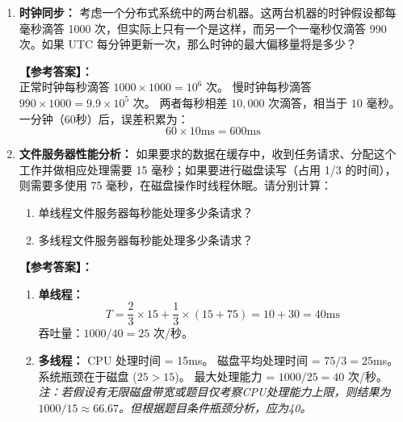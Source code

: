 \documentclass[a4paper,12pt]{article}
\newcommand{\answer}[1]{\par\vspace{0.5em}\hspace{2em}\textbf{【参考答案】：}\\{\color{blue}#1}\par\vspace{1em}}
\begin{document}
\begin{enumerate}[label=\arabic*.]
    \answer{
    \begin{enumerate}[label=(\arabic*)]
        \item 一次读取 32k 数据的 RPC 所需时间：
        \[ T = 1.0 + 32 \times 1.5 = 1.0 + 48 = 49 \text{ms} \]
        \item 32 次读取 1k 数据所需时间：
        每次调用时间 = $1.0 + 1 \times 1.5 = 2.5 \text{ms}$。
        总时间 $T_1 = 32 \times 2.5 = 80 \text{ms}$。
    \end{enumerate}
    }

    \item \textbf{时钟同步：}
    考虑一个分布式系统中的两台机器。这两台机器的时钟假设都每毫秒滴答 1000 次，但实际上只有一个是这样，而另一个一毫秒仅滴答 990 次。如果 UTC 每分钟更新一次，那么时钟的最大偏移量将是多少？
    
    \answer{
    正常时钟每秒滴答 $1000 \times 1000 = 10^6$ 次。
    慢时钟每秒滴答 $990 \times 1000 = 9.9 \times 10^5$ 次。
    两者每秒相差 $10,000$ 次滴答，相当于 $10$ 毫秒。
    一分钟（60秒）后，误差积累为：
    \[ 60 \times 10 \text{ms} = 600 \text{ms} \]
    }

    \item \textbf{文件服务器性能分析：}
    如果要求的数据在缓存中，收到任务请求、分配这个工作并做相应处理需要 15 毫秒；如果要进行磁盘读写（占用 1/3 的时间），则需要多使用 75 毫秒，在磁盘操作时线程休眠。请分别计算：
    \begin{enumerate}[label=(\arabic*)]
        \item 单线程文件服务器每秒能处理多少条请求？
        \item 多线程文件服务器每秒能处理多少条请求？
    \end{enumerate}
    
    \answer{
    \begin{enumerate}[label=(\arabic*)]
        \item \textbf{单线程：}
        \[ T = \frac{2}{3} \times 15 + \frac{1}{3} \times (15 + 75) = 10 + 30 = 40 \text{ms} \]
        吞吐量：$1000/40 = 25$ 次/秒。
        
        \item \textbf{多线程：}
        CPU 处理时间 = 15ms。
        磁盘平均处理时间 = $75/3 = 25$ms。
        系统瓶颈在于磁盘 ($25 > 15$)。
        最大处理能力 = $1000 / 25 = 40$ 次/秒。
        \textit{注：若假设有无限磁盘带宽或题目仅考察CPU处理能力上限，则结果为 $1000/15 \approx 66.67$。但根据题目条件瓶颈分析，应为40。}
    \end{enumerate}
    }


\end{enumerate}
\end{document}
